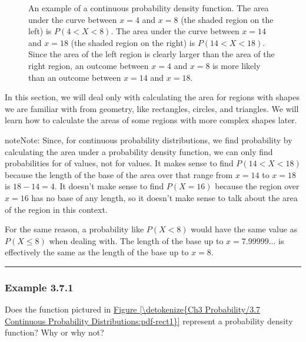 \documentclass[letterpaper,10pt,english]{jupyterBook}
\begin{document}
\begin{figure}[htbp]
\centering
\capstart

\noindent{}
\caption{An example of a continuous probability density function. The area under the curve between \(x = 4\) and \(x = 8\) (the shaded region on the left) is \(P(4 < X < 8)\). The area under the curve between \(x = 14\) and \(x = 18\) (the shaded region on the right) is \(P(14 < X < 18)\). Since the area of the left region is clearly larger than the area of the right region, an outcome between \(x = 4\) and \(x = 8\) is more likely than an outcome between \(x = 14\) and \(x = 18\).}\label{\detokenize{Ch3 Probability/3.7 Continuous Probability Distributions:pdf-example}}\end{figure}

\sphinxAtStartPar
In this section, we will deal only with calculating the area for regions with shapes we are familiar with from geometry, like rectangles, circles, and triangles. We will learn how to calculate the areas of some regions with more complex shapes later.

\begin{sphinxadmonition}{note}{Note:}
\sphinxAtStartPar
Since, for continuous probability distributions, we find probability by calculating the area under a probability density function, we can only find probabilities for  of values, not for  values. It makes sense to find \(P(14 < X < 18)\) because the length of the base of the area over that range from \(x = 14\) to \(x = 18\) is \(18 - 14 = 4\). It doesn’t make sense to find \(P(X = 16)\) because the region over \(x = 16\) has no base of any length, so it doesn’t make sense to talk about the area of the region in this context.

\sphinxAtStartPar
For the same reason, a probability like \(P(X < 8)\) would have the same value as \(P(X \leq 8)\) when dealing with. The length of the base up to \(x = 7.99999...\) is effectively the same as the length of the base up to \(x = 8\).
\end{sphinxadmonition}


\bigskip\hrule\bigskip



\subsubsection{Example 3.7.1}
\label{\detokenize{Ch3 Probability/3.7 Continuous Probability Distributions:example-3-7-1}}
\sphinxAtStartPar
Does the function pictured in \hyperref[\detokenize{Ch3 Probability/3.7 Continuous Probability Distributions:pdf-rect1}]{Figure \ref{\detokenize{Ch3 Probability/3.7 Continuous Probability Distributions:pdf-rect1}}} represent a probability density function? Why or why not?
\end{document}

